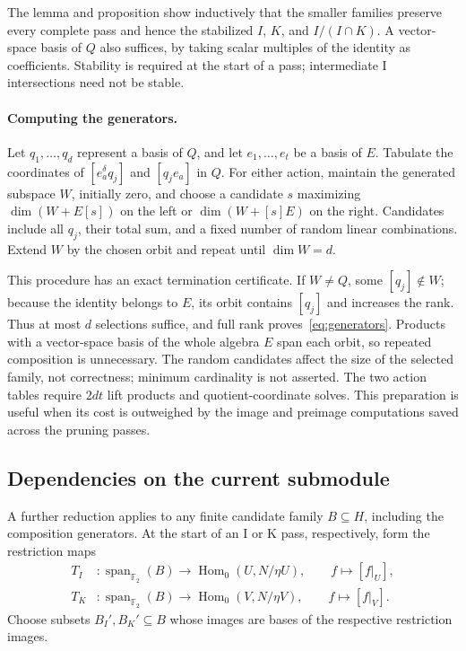 \documentclass[11pt,a4paper]{article}
\newcommand{\Hom}{\operatorname{Hom}_0}
\newcommand{\Span}{\operatorname{span}_{\mathbb F_2}}
\begin{document}
The lemma and proposition show inductively that the smaller families
preserve every complete pass and hence the stabilized $I$, $K$, and
$I/(I\cap K)$. A vector-space basis of $Q$ also suffices, by taking
scalar multiples of the identity as coefficients. Stability is required
at the start of a pass; intermediate I intersections need not be stable.

\paragraph{Computing the generators.}
Let $q_1,\ldots,q_d$ represent a basis of $Q$, and let $e_1,\ldots,e_t$
be a basis of $E$. Tabulate the coordinates of $[e_a^\delta q_j]$ and
$[q_je_a]$ in $Q$. For either action, maintain the generated subspace
$W$, initially zero, and choose a candidate $s$ maximizing
$\dim(W+E[s])$ on the left or $\dim(W+[s]E)$ on the right.
Candidates include all $q_j$, their total sum,
and a fixed number of random linear combinations. Extend $W$ by the
chosen orbit and repeat until $\dim W=d$.

This procedure has an exact termination certificate. If $W\ne Q$, some
$[q_j]\notin W$; because the identity belongs to $E$, its orbit contains
$[q_j]$ and increases the rank. Thus at most $d$ selections suffice, and
full rank proves~\eqref{eq:generators}. Products with a vector-space basis
of the whole algebra $E$ span each orbit, so repeated composition is
unnecessary. The random candidates affect the size of the selected family,
not correctness; minimum cardinality is not asserted. The two action
tables require $2dt$ lift products and quotient-coordinate solves. This
preparation is useful when its cost is outweighed by the image and
preimage computations saved across the pruning passes.

\subsection{Dependencies on the current submodule}
A further reduction applies to any finite candidate family $B\subseteq H$,
including the composition generators. At the start of an I or K pass,
respectively, form the restriction maps
\begin{align*}
 T_I&:\Span(B)\to\Hom(U,N/\eta U),\qquad f\mapsto[f|_U],\\
 T_K&:\Span(B)\to\Hom(V,N/\eta V),\qquad f\mapsto[f|_V].
\end{align*}
Choose subsets $B_I',B_K'\subseteq B$ whose images are bases of the
respective restriction images.
\end{document}
